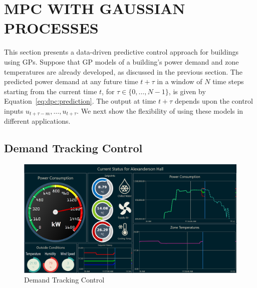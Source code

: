 \section{MPC WITH GAUSSIAN PROCESSES}
\label{S:dpc}

This section presents a data-driven predictive control approach for buildings using GPs.
Suppose that GP models of a building's power demand and zone temperatures are already developed, as discussed in the previous section.
The predicted power demand at any future time $t+\tau$ in a window of $N$ time steps starting from the current time $t$, for \(\tau \in \{0,\dots,N-1\}\), is given by Equation~\eqref{eq:dpc:prediction}.
The output at time \(t+\tau\) depends upon %
the control inputs \(u_{t+\tau-m}, \dots, u_{t+\tau}\).
We next show the flexibility of using these models in different applications.

\subsection{Demand Tracking Control}

\begin{figure}[t]
	\includegraphics[width=\linewidth]{images/Dashboard-PowerTrack.png}
	\caption{Demand Tracking Control}
	\label{F:tracking}
\end{figure}

